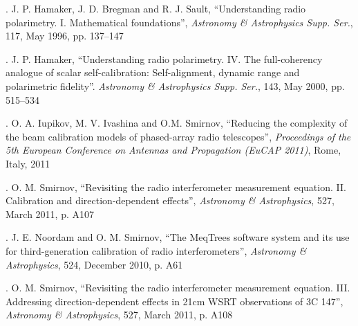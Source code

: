 \documentclass{aps2010} \special{papersize=8.5in,11in}
\begin{document}
. J. P. Hamaker, J. D. Bregman and R. J. Sault, ``Understanding radio polarimetry. I. Mathematical foundations'', 
\emph{Astronomy \& Astrophysics Supp. Ser.}, 117, May 1996, pp. 137--147

. J. P. Hamaker, ``Understanding radio polarimetry. IV. The full-coherency analogue of scalar self-calibration: Self-alignment, dynamic range and polarimetric fidelity''.
\emph{Astronomy \& Astrophysics Supp. Ser.}, 143, May 2000, pp. 515--534

. O. A. Iupikov, M. V. Ivashina and O.M. Smirnov, ``Reducing the complexity of the beam calibration models of phased-array radio telescopes'', \emph{Proceedings of the 5th European Conference on Antennas and Propagation (EuCAP 2011)}, Rome, Italy, 2011

. O. M. Smirnov, ``Revisiting the radio interferometer measurement equation. II. Calibration and direction-dependent effects'',
\emph{Astronomy \& Astrophysics}, 527, March 2011, p. A107

. J. E. Noordam and O. M. Smirnov, ``The MeqTrees software system and its use for third-generation calibration of radio interferometers'',
\emph{Astronomy \& Astrophysics}, 524, December 2010, p. A61

. O. M. Smirnov, ``Revisiting the radio interferometer measurement equation. III. Addressing direction-dependent effects in 21cm WSRT observations of 3C 147'',
\emph{Astronomy \& Astrophysics}, 527, March 2011, p. A108
\end{document}
